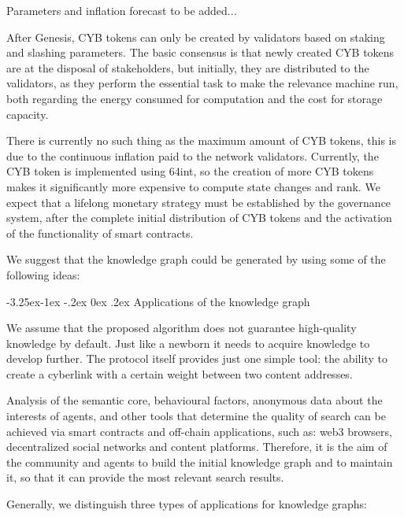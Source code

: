\documentclass[8pt,oneside]{amsart}
\makeatletter
\renewcommand\subsection{\@startsection{subsection}{2}{\z@}%
                                     {-3.25ex\@plus -1ex \@minus -.2ex}%
                                     {0ex \@plus .2ex}%
                                     {\play\Large}}%
\newcommand{\titleSection}[1]{\subsection{#1}}
\newenvironment{Figure}
  {\par\medskip\noindent\minipage{\linewidth}}
  {\endminipage\par\medskip}
\makeatother
\begin{document}
\begin{Abstract}
\begin{itemize}
\end{itemize}

\begin{Figure}
 \centering
 
\end{Figure}

Parameters and inflation forecast to be added...

After Genesis, CYB tokens can only be created by validators based on staking and slashing parameters. The basic consensus is that newly created CYB tokens are at the disposal of stakeholders, but initially, they are distributed to the validators, as they perform the essential task to make the relevance machine run, both regarding the energy consumed for computation and the cost for storage capacity.

There is currently no such thing as the maximum amount of CYB tokens, this is due to the continuous inflation paid to the network validators. Currently, the CYB token is implemented using 64int, so the creation of more CYB tokens makes it significantly more expensive to compute state changes and rank. We expect that a lifelong monetary strategy must be established by the governance system, after the complete initial distribution of CYB tokens and the activation of the functionality of smart contracts.

We suggest that the knowledge graph could be generated by using some of the following ideas:

\titleSection{Applications of the knowledge graph}\label{Applications of the knowledge graph}

We assume that the proposed algorithm does not guarantee high-quality knowledge by default. Just like a newborn it needs to acquire knowledge to develop further. The protocol itself provides just one simple tool: the ability to create a cyberlink with a certain weight between two content addresses.

Analysis of the semantic core, behavioural factors, anonymous data about the interests of agents, and other tools that determine the quality of search can be achieved via smart contracts and off-chain applications, such as: web3 browsers, decentralized social networks and content platforms. Therefore, it is the aim of the community and agents to build the initial knowledge graph and to maintain it, so that it can provide the most relevant search results.

Generally, we distinguish three types of applications for knowledge graphs:


\end{Abstract}
\end{document}

